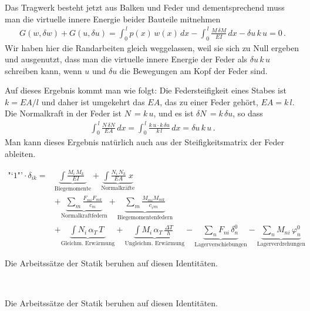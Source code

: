 Das Tragwerk besteht jetzt aus Balken und Feder und dementsprechend muss man die virtuelle innere Energie beider Bauteile mitnehmen
\begin{align}
G(w, \delta w) + G(u, \delta u) = \int_0^{\,l} p(x)\,w(x)\,dx  - \int_0^{\,l} \frac{M\,\delta M}{EI}\,dx - \delta u\,k\,u = 0\,.
\end{align}
Wir haben hier die Randarbeiten gleich weggelassen, weil sie sich zu Null ergeben und ausgenutzt, dass man die virtuelle innere Energie der Feder als $\delta u\,k\,u $ schreiben kann,
wenn $u $ und $\delta u $ die Bewegungen am Kopf der Feder sind.

Auf dieses Ergebnis kommt man wie folgt: Die Federsteifigkeit eines Stabes ist $k = EA/l$ und daher ist umgekehrt das $EA $, das zu einer Feder geh\"{o}rt, $EA = k\,l$. Die Normalkraft in der Feder ist
$N\,= k\,u $, und es ist $\delta N\,= k\,\delta u$, so dass
\begin{align}
\int_0^{\,l} \frac{N\,\delta N}{EA}\,dx = \int_0^{\,l} \frac{k\,u \cdot k\,\delta u}{k\,l} \,dx = \delta u\,k\,u\,.
\end{align}
Man kann dieses Ergebnis nat\"{u}rlich auch aus der Steifigkeitsmatrix der Feder ableiten.
\\

\begin{framed}
  \begin{align*}
    \mbox{"`}1\mbox{"'} \cdot \delta_{ik}
    = &
    \underbrace{\int\frac{M_{i}\,M_{k}}{EI}\;}_{\text{Biegemomente}}
    + \underbrace{\int\frac{N_{i}\,N_{k}}{EA}\;x}_{\text{Normalkr\"{a}fte}}
    \\[1em]
    &
    + \underbrace{\sum_m \frac{F_{mi}F_{mk}}{c_{m}}}_{\text{Normalkraftfedern}}
    + \underbrace{\sum_m \frac{M_{mi}M_{mk}}{c_{\varphi m}}}_{\text{Biegemomentenfedern}}
    \\[2em]
    &
    + \underbrace{\int N_i\,\alpha_T\,T\;}_{\text{Gleichm. Erw\"{a}rmung}}
    + \underbrace{\int M_i\,\alpha_T\,\frac{\Delta T}{h}\;}_{\text{Ungleichm. Erw\"{a}rmung}}
    - \underbrace{\sum_n F_{ni}\,\delta^0_{n}}_{\text{Lagerverschiebungen}}
    - \underbrace{\sum_n M_{ni}\,\varphi^0_{n}}_{\text{Lagerverdrehungen}}
  \end{align*}
\end{framed}


\colorbox{hellgrau}{\parbox{0.8\textwidth}{Die Arbeitss\"{a}tze der Statik beruhen auf diesen Identit\"{a}ten.}}\\


\colorbox{hellgrau}{\parbox{0.8\textwidth}{Die Arbeitss\"{a}tze der Statik beruhen auf diesen Identit\"{a}ten.}}\\

